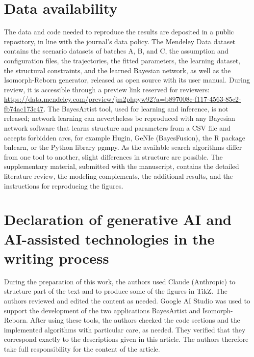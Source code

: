 
\section*{Data availability}

The data and code needed to reproduce the results are deposited in a public repository, in line with the journal's data policy. The Mendeley Data dataset \citep{screborn2026data} contains the scenario datasets of batches A, B, and C, the assumption and configuration files, the trajectories, the fitted parameters, the learning dataset, the structural constraints, and the learned Bayesian network, as well as the Isomorph-Reborn generator, released as open source with its user manual. During review, it is accessible through a preview link reserved for reviewers: \url{https://data.mendeley.com/preview/jm2phpyw92?a=b897008c-f117-4563-85e2-fb74ac173c47}. The BayesArtist tool, used for learning and inference, is not released; network learning can nevertheless be reproduced with any Bayesian network software that learns structure and parameters from a CSV file and accepts forbidden arcs, for example Hugin, GeNIe (BayesFusion), the R package bnlearn, or the Python library pgmpy. As the available search algorithms differ from one tool to another, slight differences in structure are possible. The supplementary material, submitted with the manuscript, contains the detailed literature review, the modeling complements, the additional results, and the instructions for reproducing the figures.

\section*{Declaration of generative AI and AI-assisted technologies in the writing process}

During the preparation of this work, the authors used Claude (Anthropic) to structure part of the text and to produce some of the figures in TikZ. The authors reviewed and edited the content as needed. Google AI Studio was used to support the development of the two applications BayesArtist and Isomorph-Reborn. After using these tools, the authors checked the code sections and the implemented algorithms with particular care, as needed. They verified that they correspond exactly to the descriptions given in this article. The authors therefore take full responsibility for the content of the article.

